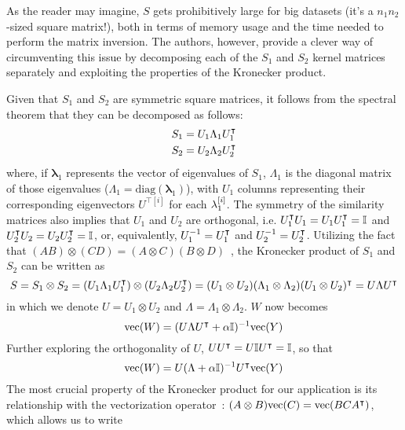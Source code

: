 \begin{apendicesenv}
As the reader may imagine, $S$ gets prohibitively large for big datasets (it's a $n_1 n_2$-sized square matrix!), both in terms of memory usage and the time needed to perform the matrix inversion. The authors, however, provide a clever way of circumventing this issue by decomposing each of the $S_1$ and $S_2$ kernel matrices separately and exploiting the properties of the Kronecker product.

Given that $S_1$ and $S_2$ are symmetric square matrices, it follows from the spectral theorem that they can be decomposed as follows:  %
%
\begin{gather*}
    S_1 = U_1 \Lambda_1 U_1^\intercal \\
    S_2 = U_2 \Lambda_2 U_2^\intercal
\end{gather*}
%
where, if $\mathbf{\lambda}_1$ represents the vector of eigenvalues of $S_1$, $\Lambda_1$ is the diagonal matrix of those eigenvalues ($\Lambda_1 = \text{diag}(\mathbf{\lambda}_1)$), with $U_1$ columns representing their corresponding eigenvectors $U^{\intercal[i]}$ for each $\mathbf{\lambda}_1^{[i]}$. The symmetry of the similarity matrices also implies that $U_1$ and $U_2$ are orthogonal, i.e. $U_1^\intercal U_1 = U_1 U_1^\intercal = \mathbb{I}$ and $U_2^\intercal U_2 = U_2 U_2^\intercal = \mathbb{I}$, or, equivalently, $U_1^{-1} = U_1^\intercal$ and $U_2^{-1} = U_2^\intercal$.
%
Utilizing the fact that $(AB) \otimes (CD) = (A \otimes C)(B \otimes D)$~\cite{schafer1966introduction}, the Kronecker product of $S_1$ and $S_2$ can be written as
%
\begin{equation}
    S = S_1 \otimes S_2
    = (U_1 \Lambda_1 U_1^\intercal) \otimes (U_2 \Lambda_2 U_2^\intercal)
    = (U_1 \otimes U_2) (\Lambda_1 \otimes \Lambda_2) (U_1 \otimes U_2)^\intercal
    = U \Lambda U^\intercal
\end{equation}
%
in which we denote $U = U_1 \otimes U_2$ and $\Lambda = \Lambda_1 \otimes \Lambda_2$.
$W$ now becomes
%
\begin{equation*}
    \text{vec}(W) = (U \Lambda U^\intercal + \alpha \mathbb{I})^{-1} \text{vec}(Y)
\end{equation*}
%
Further exploring the orthogonality of $U$, $U U^\intercal = U \mathbb{I} U^\intercal = \mathbb{I}$, so that
%
\begin{equation*}
    \text{vec}(W) = U (\Lambda + \alpha\mathbb{I})^{-1} U^\intercal \text{vec}(Y)
\end{equation*}
%
The most crucial property of the Kronecker product for our application is its relationship with the vectorization operator~\cite{schafer1966introduction}: $(A \otimes B)\text{vec} (C) = \text{vec}(BCA^\intercal)$, which allows us to write

\end{apendicesenv}

